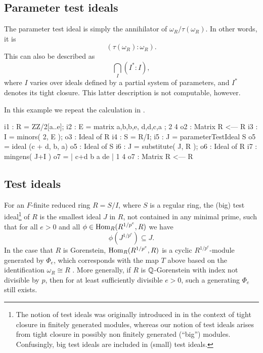 \documentclass{amsart}
\begin{document}
\subsection{Parameter test ideals}

The parameter test ideal is simply the annihilator of $\omega_R/\tau(\omega_R)$.  In other words, it is
\[
( \tau(\omega_R) : \omega_R ).
\]
This can also be described as
\[
\bigcap_{I} (I^* : I),
\]
where $I$ varies over ideals defined by a partial system of parameters, and $I^*$ denotes its tight closure.  This latter description is not computable, however.

\begin{example}\label{Example: parameter test ideal}
In this example we repeat the calculation in \cite[\S 9]{KatzmanParameterTestIdealOfCMRings}.

\medskip
{\small
\begin{MyVerbatim}
i1 : R = ZZ/2[a..e];
i2 : E = matrix { {a,b,b,e}, {d,d,c,a} };
             2       4
o2 : Matrix R  <--- R
i3 : I = minors( 2, E );
o3 : Ideal of R
i4 : S = R/I;
i5 : J = parameterTestIdeal S
o5 = ideal (c + d, b, a)
o5 : Ideal of S
i6 : J = substitute( J, R );
o6 : Ideal of R
i7 : mingens( J+I )
o7 = | c+d b a de |
             1       4
o7 : Matrix R  <--- R
\end{MyVerbatim}
}\medskip

\end{example}

\subsection{Test ideals}

For an $F$-finite reduced ring $R = S/I$, where $S$ is a regular ring, the (big) test ideal\footnote{The notion of test ideals was originally introduced in \cite{HochsterHunekeTC1} in the context of tight closure in finitely generated modules, whereas our notion of test ideals arises from
tight closure in possibly non finitely generated (``big'') modules. Confusingly, big test ideals are included in (small) test ideals.}
of $R$ is the smallest ideal $J$ in $R$, not contained in any minimal prime, such that for all $e > 0$ and all $\phi \in \operatorname{Hom}_R(R^{1/p^e}, R)$ we have
\[ \phi(J^{1/p^e}) \subseteq J.\]
In the case that $R$ is Gorenstein,
$\operatorname{Hom}_R(R^{1/p^e}, R)$ is a cyclic $R^{1/p^e}$-module generated by
$\Phi_e$, which corresponds with the map $T$ above based on the identification
$\omega_R \cong R$ \cite{BlickleSchwedeSurveyPMinusE}.  More generally, if $R$ is $\mathbb{Q}$-Gorenstein with index not divisible by $p$, then for at least sufficiently divisible $e > 0$, such a generating $\Phi_e$ still exists.
\end{document}
